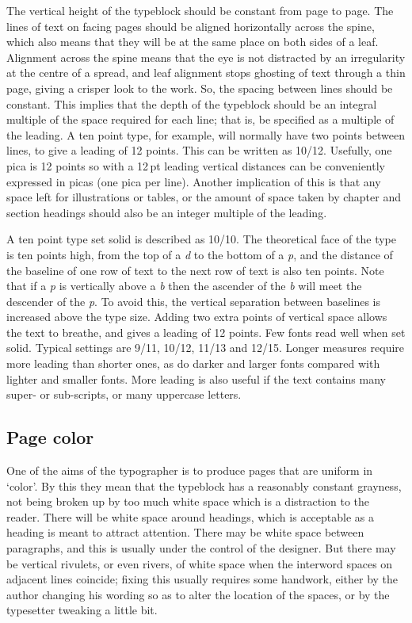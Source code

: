 \documentclass[10pt,letterpaper,extrafontsizes]{memoir}
\newcommand\U[2]{\textrm{#1}\,\textrm{#2}}
\begin{document}
   The vertical height of the typeblock should be constant from page to
page. The lines of text on facing pages should be aligned
horizontally across the spine, which also means that they will be at
the same place on both sides of a leaf. Alignment across the spine
means that the eye is not distracted by an irregularity at the centre
of a spread, and leaf alignment stops ghosting of text through a thin page,
giving a crisper look to the work. 
So, the spacing between lines should
be constant. This implies that the depth of the typeblock should be an
integral multiple of the space required for each line; that is, be specified
as a multiple of the leading. A ten point type, for example, will normally
have two points between lines, to give a leading of 12 points. This can be
written as 10/12. Usefully, one pica is 12 points so with a \U{12}{pt} leading
vertical distances can be conveniently expressed in picas 
(one pica per line). Another implication of this is that any space left 
for illustrations or tables, or
the amount of space taken by chapter and section headings 
should also be
an integer multiple of the leading.

    A ten point type set solid is described as 10/10. The theoretical
face of the type is ten points high, from the top of a \emph{d} to the bottom
of a \emph{p}, and the distance of the baseline of one row of text to the
next row of text is also ten points. Note that if a \emph{p} is vertically
above a \emph{b} then the ascender of the \emph{b} will meet the descender
of the \emph{p}. To avoid this, the vertical separation between baselines 
is increased above the type size. Adding two extra points of vertical space
allows the text to breathe, and gives a leading of 12 points. Few fonts
read well when set solid. Typical settings are 9/11, 10/12, 11/13 and 12/15.
Longer measures require more leading than shorter ones, as do darker 
and larger
fonts compared with lighter and smaller fonts. More leading is also
useful if the text contains many super- or 
sub-scripts, or many uppercase letters.



\subsection{Page color}

    One of the aims of the typographer is to produce pages that are uniform
in `color'. By this they mean that the 
typeblock has a reasonably constant
grayness, not being broken up by too much white space which is a distraction
to the reader. There will be white space around headings, 
which is acceptable as a heading is meant to attract attention. 
There may be white space between paragraphs, and this is 
usually under the control of the designer. But there 
may be vertical rivulets, or even rivers, of white space when the 
interword spaces on adjacent lines coincide; fixing this usually 
requires some handwork, either
by the author changing his wording so as to alter the location of
the spaces, or by the typesetter tweaking a little bit. 
\end{document}

